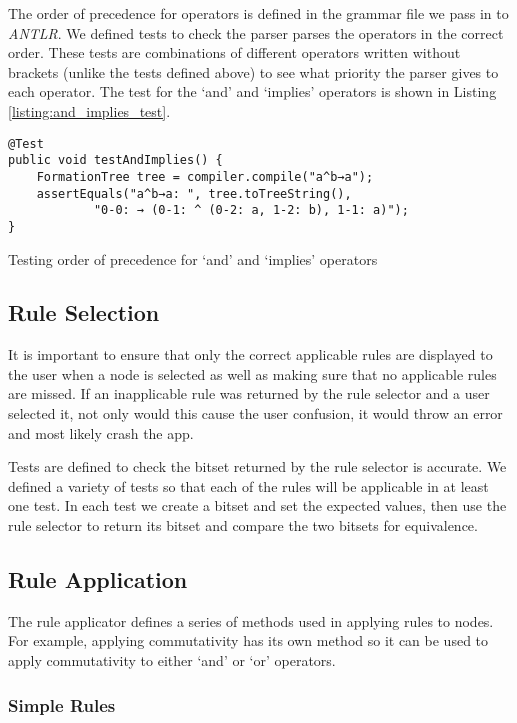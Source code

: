\documentclass{report}
\begin{document}
The order of precedence for operators is defined in the grammar file we pass in to \emph{ANTLR}. We defined tests to check the parser parses the operators in the correct order. These tests are combinations of different operators written without brackets (unlike the tests defined above) to see what priority the parser gives to each operator. The test for the `and' and `implies' operators is shown in Listing \ref{listing:and_implies_test}.

\begin{listing}[ht]
\begin{verbatim}
@Test
public void testAndImplies() {
    FormationTree tree = compiler.compile("a^b→a");
    assertEquals("a^b→a: ", tree.toTreeString(), 
            "0-0: → (0-1: ^ (0-2: a, 1-2: b), 1-1: a)");
}
\end{verbatim}
\caption{Testing order of precedence for `and' and `implies' operators}
\label{listing:and_implies_test}
\end{listing}

\subsection{Rule Selection}

It is important to ensure that only the correct applicable rules are displayed to the user when a node is selected as well as making sure that no applicable rules are missed. If an inapplicable rule was returned by the rule selector and a user selected it, not only would this cause the user confusion, it would throw an error and most likely crash the app.

Tests are defined to check the bitset returned by the rule selector is accurate. We defined a variety of tests so that each of the rules will be applicable in at least one test. In each test we create a bitset and set the expected values, then use the rule selector to return its bitset and compare the two bitsets for equivalence.

\subsection{Rule Application}

The rule applicator defines a series of methods used in applying rules to nodes. For example, applying commutativity has its own method so it can be used to apply commutativity to either `and' or `or' operators.

\subsubsection{Simple Rules}
\end{document}
